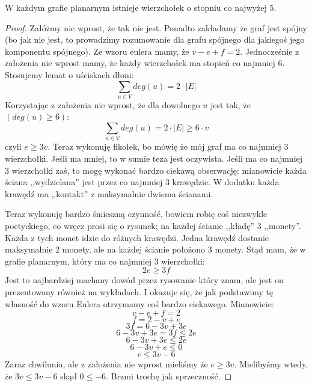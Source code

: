 \begin{theorem}
	W każdym grafie planarnym istnieje wierzchołek o stopniu co najwyżej 5.
\end{theorem}
\begin{proof}
	Załóżmy nie wprost, że tak nie jest. Ponadto zakładamy że graf jest spójny (bo jak nie jest, to prowadzimy rozumowanie dla grafu spójnego dla jakiegoś jego komponentu spójnego). Ze wzoru eulera mamy, że $v - e + f = 2$. Jednocześnie z założenia nie wprost mamy, że każdy wierzchołek ma stopień co najmniej 6. Stosujemy lemat o uściskach dłoni:
	\begin{equation*}
		\sum_{u \in V} deg(u) = 2 \cdot |E|
	\end{equation*}
	Korzystając z założenia nie wprost, że dla dowolnego $u$ jest tak, że $(deg(u) \geq 6)$:
	\begin{equation*}
		\sum_{u \in V} deg(u) = 2 \cdot |E| \geq 6 \cdot v
	\end{equation*}
	czyli $e \geq 3v $. Teraz wykonuję fikołek, bo mówię że mój graf ma co najmniej 3 wierzchołki. Jeśli ma mniej, to w sumie teza jest oczywista. Jeśli ma co najmniej 3 wierzchołki zaś, to mogę wykonać bardzo ciekawą obserwację: mianowicie każda ściana ,,wydzielana'' jest przez co najmniej 3 krawędzie. W dodatku każda krawędź ma ,,kontakt'' z maksymalnie dwiema ścianami.

	Teraz wykonuję bardzo śmieszną czynność, bowiem robię coś niezwykle poetyckiego, co wręcz prosi się o rysunek; na każdej ścianie ,,kładę'' 3 ,,monety''. Każda z tych monet idzie do różnych krawędzi. Jedna krawędź dostanie maksymalnie 2 monety, ale na każdej ścianie położono 3 monety. Stąd mam, że w grafie planarnym, który ma co najmniej 3 wierzchołki:
	\begin{equation*}
		2e \geq 3f
	\end{equation*}
	Jest to najbardziej machany dowód przez rysowanie który znam, ale jest on prezentowany również na wykładach. I okazuje się, że jak podstawimy tę własność do wzoru Eulera otrzymamy coś bardzo ciekawego. Mianowicie:
	\begin{equation*}
		v - e + f = 2
	\end{equation*}
	\begin{equation*}
		f = 2 - v + e
	\end{equation*}
	\begin{equation*}
		3f = 6 - 3v + 3e
	\end{equation*}
	\begin{equation*}
		6 - 3v + 3e = 3f \leq 2e
	\end{equation*}
	\begin{equation*}
		6 - 3v + 3e \leq 2e
	\end{equation*}
	\begin{equation*}
		6 - 3v + e \leq 0
	\end{equation*}
	\begin{equation*}
		e \leq 3v - 6
	\end{equation*}
	Zaraz chwilunia, ale z założenia nie wprost mieliśmy że $e \geq 3v$. Mielibyśmy wtedy, że $3v \leq 3v-6$ skąd $0 \leq -6$. Brzmi trochę jak sprzeczność.
\end{proof}

